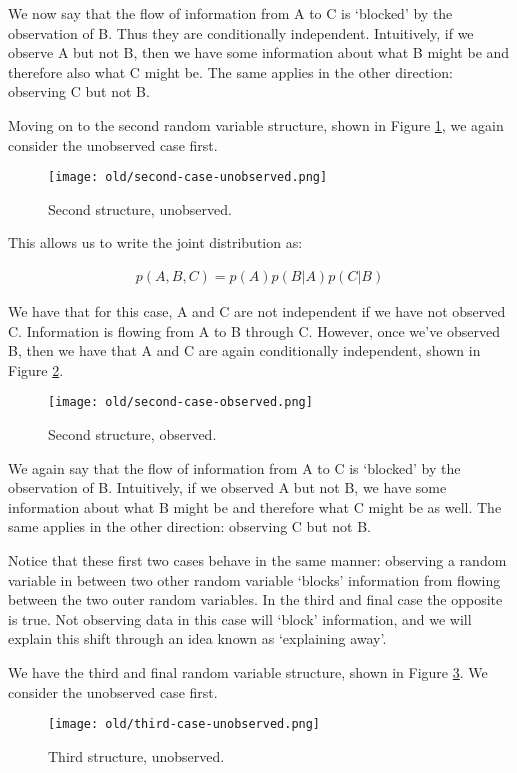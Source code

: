 We now say that the flow of information from A to C is `blocked' by the observation of B. Thus they are conditionally independent. Intuitively, if we observe A but not B, then we have some information about what B might be and therefore also what C might be. The same applies in the other direction: observing C but not B.

Moving on to the second random variable structure, shown in Figure \ref{fig:second-case-unobserved}, we again consider the unobserved case first.
\begin{figure}
	\centering
	\texttt{[image: old/second-case-unobserved.png]}
	\caption{Second structure, unobserved.}
	\label{fig:second-case-unobserved}
\end{figure}

This allows us to write the joint distribution as:

\begin{align*}
	p(A, B, C) = p(A) p(B | A) p(C | B)
\end{align*}

We have that for this case, A and C are not independent if we have not observed C. Information is flowing from A to B through C. However, once we've observed B, then we have that A and C are again conditionally independent, shown in Figure \ref{fig:second-case-observed}.

\begin{figure}
	\centering
	\texttt{[image: old/second-case-observed.png]}
	\caption{Second structure, observed.}
	\label{fig:second-case-observed}
\end{figure}

We again say that the flow of information from A to C is `blocked' by the observation of B. Intuitively, if we observed A but not B, we have some information about what B might be and therefore what C might be as well.  The same applies in the other direction: observing C but not B.

Notice that these first two cases behave in the same manner: observing a random variable in between two other random variable `blocks' information from flowing between the two outer random variables. In the third and final case the opposite is true. Not observing data in this case will `block' information, and we will explain this shift through an idea known as `explaining away'.

We have the third and final random variable structure, shown in Figure \ref{fig:third-case-unobserved}. We consider the unobserved case first.
\begin{figure}
	\centering
	\texttt{[image: old/third-case-unobserved.png]}
	\caption{Third structure, unobserved.}
	\label{fig:third-case-unobserved}
\end{figure}

